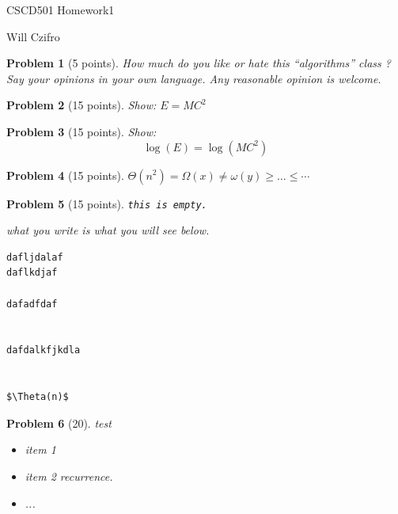 \documentclass[11pt]{article}
\newtheorem{problem}{Problem}
\begin{document}
\begin{center}
  {\LARGE CSCD501 Homework1}

\bigskip 

{\Large Will Czifro}

\end{center}

\bigskip 

\begin{problem}[5 points]
\label{prob:1}
 How much do you like or hate this 
``algorithms'' class ?  Say your opinions in
  your own language. Any reasonable opinion is welcome.
\end{problem}




\begin{problem}[15 points]
\label{prob:2}
  Show: $E=MC^2$
\end{problem}




\begin{problem}[15 points]
\label{prob:3}
Show: 
$$
\log(E) = \log (MC^2)
$$
\end{problem}




\begin{problem}[15 points]
\label{prob:4}
$\Theta(n^2) = \Omega(x) \neq \omega(y) \geq \ldots \leq \cdots  $
\end{problem}





\begin{problem}[15 points]
\label{prob:5}
{\tt this is empty.}

what you write is what you will see below. 

\begin{verbatim}
dafljdalaf
daflkdjaf

dafadfdaf


dafdalkfjkdla


$\Theta(n)$
\end{verbatim}
\end{problem}



\begin{problem}[20]
\label{prob:6}
test
\begin{itemize}
\item 
item 1

\item 
item 2 recurrence. 
\item ...
\end{itemize}
 
\end{problem}
\end{document}
